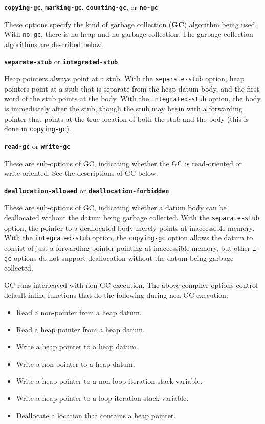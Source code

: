 \documentclass[12pt]{article}
\newcommand{\key}[1]{{\rm \bfseries #1}}
\newcommand{\ttkey}[1]{{\tt \bfseries #1}}
\newenvironment{indpar}[1][0.3in]%
	{\begin{list}{}%
		     {\setlength{\itemsep}{0in}%
		      \setlength{\topsep}{0in}%
		      \setlength{\parsep}{1ex}%
		      \setlength{\labelwidth}{#1}%
		      \setlength{\leftmargin}{#1}%
		      \addtolength{\leftmargin}{\labelsep}}%
	 \item}%
	{\end{list}}
\begin{document}
\begin{indpar}

\ttkey{copying-gc}, \ttkey{marking-gc}, \ttkey{counting-gc}, or \ttkey{no-gc}
\begin{indpar}
These options specify the kind of garbage collection (\key{GC})
algorithm being used.
With {\tt no-gc}, there is no heap and no garbage collection.
The garbage collection algorithms are described below.
\end{indpar}

\ttkey{separate-stub} or \ttkey{integrated-stub}
\begin{indpar}
Heap pointers always point at a stub.
With the {\tt separate-stub} option, heap pointers point at a stub that is
separate from the heap datum body, and the first word of the stub points at the
body.  With the {\tt integrated-stub} option,
the body is immediately after the
stub, though the stub may begin with a forwarding pointer
that points at the true location of both the stub and the body
(this is done in {\tt copying-gc}).
\end{indpar}

\ttkey{read-gc} or \ttkey{write-gc}
\begin{indpar}
These are sub-options of GC, indicating whether the GC is
read-oriented or write-oriented.  See the descriptions
of GC below.
\end{indpar}

\ttkey{deallocation-allowed} or \ttkey{deallocation-forbidden}
\begin{indpar}
These are sub-options of GC, indicating whether a datum body can be
deallocated without the datum being garbage collected.  With the
{\tt separate-stub} option, the pointer to a deallocated body merely points
at inaccessible memory.  With the {\tt integrated-stub} option, the
{\tt copying-gc} option allows the datum to consist of just a forwarding
pointer pointing at inaccessible memory, but other {\tt \ldots-gc}
options do not support deallocation without the datum being garbage collected.
\end{indpar}

\end{indpar}

GC runs interleaved with non-GC execution.
The above compiler options control default inline functions that do the
following during non-GC execution:
\begin{itemize}
\item Read a non-pointer from a heap datum.
\item Read a heap pointer from a heap datum.
\item Write a heap pointer to a heap datum.
\item Write a non-pointer to a heap datum.
\item Write a heap pointer to a non-loop iteration stack variable.
\item Write a heap pointer to a loop iteration stack variable.
\item Deallocate a location that contains a heap pointer.
\end{itemize}
\end{document}
